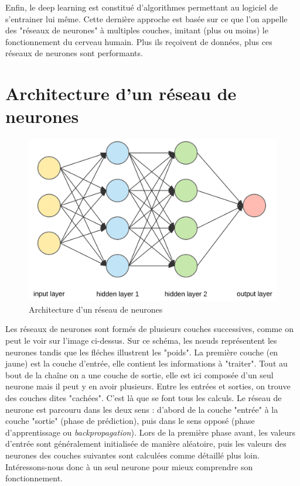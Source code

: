 	Enfin, le deep learning est constitué d'algorithmes permettant au logiciel de s'entrainer lui même. Cette dernière approche est basée sur ce que l'on appelle des "réseaux de neurones" à multiples couches, imitant (plus ou moins) le fonctionnement du cerveau humain. Plus ils reçoivent de données, plus ces réseaux de neurones sont performants.
	
\section{Architecture d'un réseau de neurones}

	\begin{figure}[H]
		\centering
		\includegraphics[width=0.75\linewidth]{images/reseau}
		\caption{Architecture d'un réseau de neurones}
	\end{figure}

	Les réseaux de neurones sont formés de plusieurs couches successives, comme on peut le voir sur l'image ci-dessus. Sur ce schéma, les n\oe uds représentent les neurones tandis que les fléches illustrent les "poids". La première couche (en jaune) est la couche d'entrée, elle contient les informations à "traiter". Tout au bout de la chaîne on a une couche de sortie, elle est ici composée d'un seul neurone mais il peut y en avoir plusieurs. Entre les entrées et sorties, on trouve des couches dites "cachées". C'est là que se font tous les calculs. Le réseau de neurone est parcouru dans les deux sens : d'abord de la couche "entrée" à la couche "sortie" (phase de prédiction), puis dans le sens opposé (phase d'apprentissage ou \textit{backpropagation}). Lors de la première phase avant, les valeurs d'entrée sont généralement initialisée de manière aléatoire, puis les valeurs des neurones des couches suivantes sont calculées comme détaillé plus loin. Intéressons-nous donc à un seul neurone pour mieux comprendre son fonctionnement.

